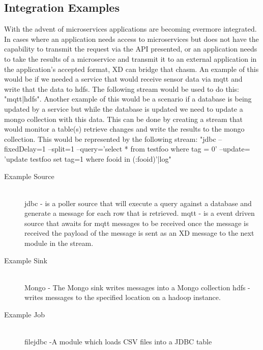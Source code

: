 \subsection{Integration Examples}
With the advent of microservices \cite{microservices-pattern} applications are becoming 
evermore integrated.  In cases where an application needs access to microservices but does not 
have the capability to transmit the request via the API presented, or an application needs to 
take the results of a microservice and transmit it to  an external application in the application's 
accepted format, XD can bridge that chasm. 
An example of this would be if we needed a service that would receive sensor data via mqtt 
and write that the data to hdfs. The following stream would be used to do this: "mqtt|hdfs".
Another example of this would be a scenario if a database is being updated by a service 
but while the database is updated we need to update a mongo collection 
with this data.  This can be done by creating a stream that would monitor a table(s) 
retrieve changes and write the results to the mongo collection.  This would be 
represented by the following stream: 
"jdbc --fixedDelay=1 --split=1 --query='select * from testfoo where tag = 0' --update=
'update testfoo set tag=1 where fooid in (:fooid)'|log" 
\begin{description}
\item[Example Source] \hfill \\
jdbc - is a poller source that will execute a query against a database and generate a 
message for each row that is retrieved.  \cite{jdbc-module}
mqtt - is a event driven source that awaits for mqtt messages to be received once the message is
 received the payload of the message is sent as an XD message to the next module in the 
 stream.  \cite{mqtt-module}
\item[Example Sink] \hfill \\
Mongo - The Mongo sink writes messages into a Mongo collection \cite{mongo-module}
hdfs - writes messages to the specified location on a hadoop instance. \cite{hadoop-hdfs-module}
\item[Example Job] \hfill \\
filejdbc -A module which loads CSV files into a JDBC table\par
\end{description}
